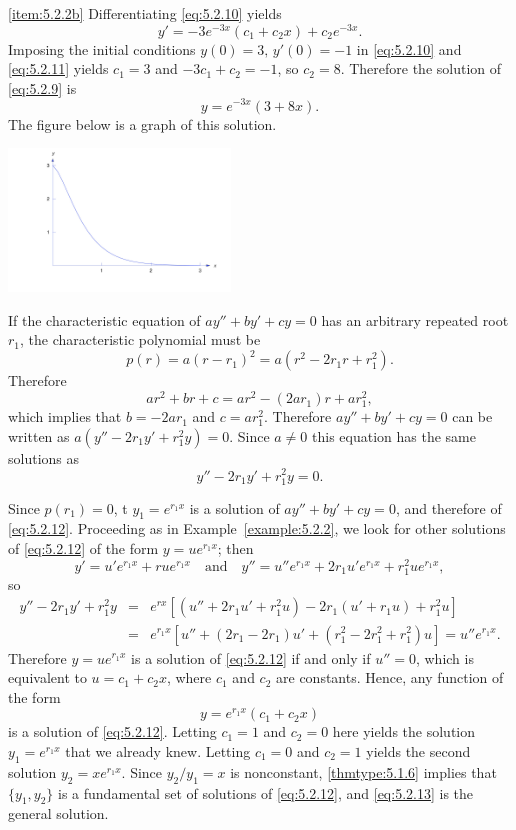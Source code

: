 \documentclass{ximera}
\begin{document}
\begin{example}
\begin{explanation}
\ref{item:5.2.2b}  Differentiating   \eqref{eq:5.2.10} yields
\begin{equation} \label{eq:5.2.11}
y'=-3e^{-3x}(c_1+c_2x)+c_2e^{-3x}.
\end{equation}
Imposing the initial conditions $y(0)=3,\, y'(0)=-1$ in \eqref{eq:5.2.10}
and \eqref{eq:5.2.11} yields $c_1=3$ and $-3c_1+c_2=-1$, so
$c_2=8$. Therefore the solution of \eqref{eq:5.2.9} is
$$
y=e^{-3x}(3+8x).
$$
The figure below is a graph of this solution.

\begin{image}
 \includegraphics[height=1.5in]{fig050202.jpg}
\end{image}

\end{explanation}
\end{example}



If the characteristic equation of $ay''+by'+cy=0$
has an arbitrary repeated root $r_1$,  the
characteristic polynomial must be
$$
p(r)=a(r-r_1)^2=a(r^2-2r_1r+r_1^2).
$$
Therefore
$$
ar^2+br+c=ar^2-(2ar_1)r+ar_1^2,
$$
which implies that $b=-2ar_1$ and $c=ar_1^2$.
Therefore
 $ay''+by'+cy=0$ can be written as
$a(y''-2r_1y'+r_1^2y)=0$. Since $a\neq 0$ this equation has the same
solutions as
\begin{equation} \label{eq:5.2.12}
y''-2r_1y'+r_1^2y=0.
\end{equation}

Since $p(r_1)=0$, t $y_1=e^{r_1x}$ is a solution of
$ay''+by'+cy=0$, and therefore of \eqref{eq:5.2.12}. Proceeding as in
Example~\ref{example:5.2.2}, we look for other solutions of \eqref{eq:5.2.12}
of the form $y=ue^{r_1x}$; then
$$
y'=u'e^{r_1x}+rue^{r_1x}\quad\mbox{and}\quad
y''=u''e^{r_1x}+2r_1u'e^{r_1x}+r_1^2ue^{r_1x},
$$
so
\begin{eqnarray*}
y''-2r_1y'+r_1^2y&=&e^{rx}\left[(u''+2r_1u'+r_1^2u)-
2r_1(u'+r_1u)+r_1^2u\right]\\
&=&e^{r_1x}\left[u''+(2r_1-2r_1)u'+(r_1^2-2r_1^2+r_1^2)u\right]=u''e^{r_1x}.
\end{eqnarray*}
Therefore $y=ue^{r_1x}$ is a solution of \eqref{eq:5.2.12} if and only if
$u''=0$, which is equivalent to $u=c_1+c_2x$, where $c_1$ and $c_2$
are constants. Hence, any function of the form
\begin{equation} \label{eq:5.2.13}
y=e^{r_1x}(c_1+c_2x)
\end{equation}
is  a solution of \eqref{eq:5.2.12}.
Letting $c_1=1$ and $c_2=0$ here yields the solution
 $y_1=e^{r_1x}$ that we already knew. Letting $c_1=0$ and $c_2=1$
yields the second solution $y_2=xe^{r_1x}$. Since
$y_2/y_1=x$
is nonconstant, \ref{thmtype:5.1.6} implies that   $\{y_1,y_2\}$ is
a fundamental set of solutions of \eqref{eq:5.2.12}, and \eqref{eq:5.2.13}
is the general solution.
\end{document}
